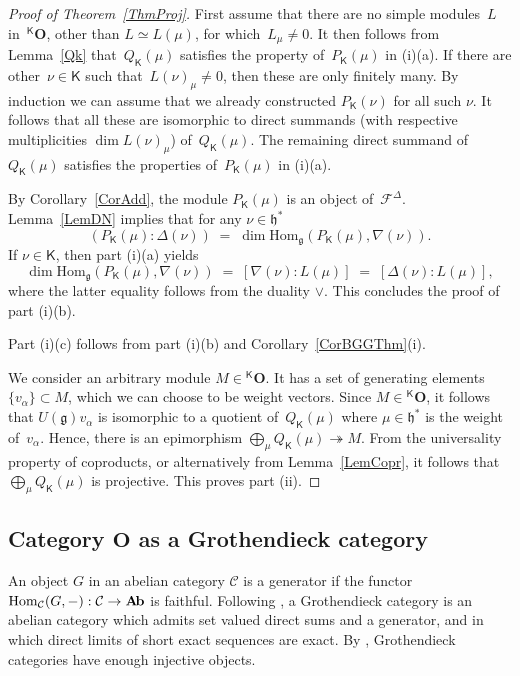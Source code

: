 \documentclass[11pt]{amsart}
\newcommand{\Ab}{\mathbf{A\hspace{-0.5mm}b}}
\newcommand{\KKK}{\mathsf{K}}
\newcommand{\cF}{{\mathcal{F}}}
\newcommand{\tto}{\twoheadrightarrow}
\newcommand{\bO}{\mathbf{O}}
\newcommand{\Hom}{\mathrm{Hom}}
\newcommand{\cC}{\mathcal{C}}
\newcommand{\fg}{\mathfrak{g}}
\newcommand{\fh}{\mathfrak{h}}
\numberwithin{equation}{section}
\theoremstyle{plain}
\theoremstyle{remark}
\theoremstyle{remark}
\theoremstyle{construction}
\begin{document}
\begin{proof}[Proof of Theorem~\ref{ThmProj}]

First assume that there are no simple modules~$L$ in~${}^{\KKK}\bO$, other than $L{\simeq}L(\mu)$, for which~$L_\mu\not=0$. It then follows from Lemma~\ref{Qk} that~$Q_{\KKK}(\mu)$ satisfies the property of~$P_{\KKK}(\mu)$ in (i)(a). If there are other~$\nu\in\KKK$ such that~$L(\nu)_\mu\not=0$, then {these} are only finitely many. By induction we can assume that we already constructed $P_{\KKK}(\nu)$ for all {such $\nu$}. It follows that all these are {isomorphic to} direct summands ({with respective multiplicities} $\dim L(\nu)_\mu$) of~$Q_{\KKK}(\mu)$. 
The remaining direct summand of~$Q_{\KKK}(\mu)$ satisfies the properties of~$P_{\KKK}(\mu)$ in (i)(a).


By Corollary~\ref{CorAdd}, the module ${P}_{\KKK}(\mu)$ is {an object of}~$\cF^\Delta$.  
Lemma~\ref{LemDN} implies that for any $\nu\in\fh^\ast$
$$(P_{\KKK}(\mu):\Delta(\nu))\;=\;\dim\Hom_{\fg}(P_{\KKK}(\mu),\nabla(\nu)).$$
If $\nu\in\KKK$, then part (i)(a) {yields}
$$\dim\Hom_{\fg}(P_{\KKK}(\mu),\nabla(\nu))\;=\;[\nabla(\nu):L(\mu)]\;=\; [\Delta(\nu):L(\mu)],$$
where the latter equality follows from the duality $\vee$. This concludes the proof of part (i)(b).

Part (i)(c) follows from part (i)(b) and Corollary~\ref{CorBGGThm}(i).

We consider an arbitrary module $M\in {}^{\KKK}\bO$. It has a set of generating elements~$\{v_\alpha\}\subset M$, which we can choose to be weight vectors. Since $M\in {}^{\KKK}\bO$, it follows {that} $U(\fg)v_\alpha$ is  {isomorphic to} a quotient of~$Q_{\KKK}(\mu)$ {where} $\mu\in\fh^\ast$ {is} the weight of~$v_\alpha$. Hence, {there is} an epimorphism $\bigoplus_\mu Q_{\KKK}(\mu)\tto M$. From the universality property of coproducts, or alternatively from Lemma~\ref{LemCopr}, it follows that~$\bigoplus_\mu Q_{\KKK}(\mu)$ is projective. This proves part (ii).
\end{proof}



\subsection{Category $\bO$ as a Grothendieck category}\label{GroCat}

An object $G$ in an abelian category $\cC$ is a generator if the functor $\Hom_{\cC}(G,-):\cC\to\Ab$ is faithful. Following \cite{KS}, a Grothendieck category is an abelian category which admits set valued direct sums and a generator{,} and in which direct limits of short exact sequences are exact. By \cite[Theorem~9.6.2]{KS}, Grothendieck categories have enough injective objects.
 
\end{document}
